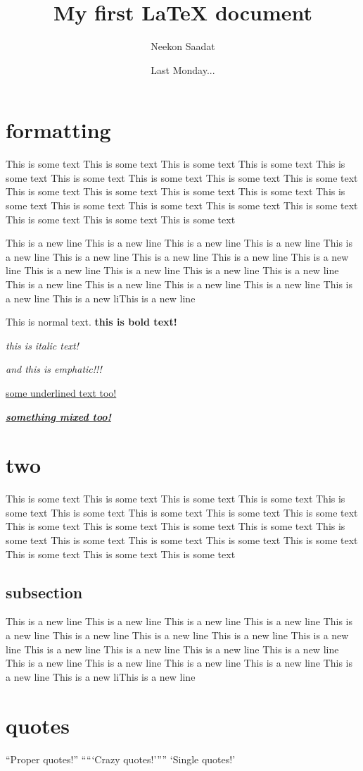\documentclass{article}
\author{Neekon Saadat}
\title{My first {\LaTeX} document}
\date{Last Monday...}
\begin{document}
\maketitle
\section{formatting}
This is some text This is some text This is some text This is some text This is some text This is some text This is some text This is some text This is some text This is some text This is some text This is some text This is some text This is some text This is some text This is some text This is some text This is some text This is some text This is some text This is some text 

This is a new line This is a new line This is a new line This is a new line This is a new line This is a new line This is a new line This is a new line This is a new line This is a new line This is a new line This is a new line This is a new line This is a new line This is a new line This is a new line This is a new line This is a new line This is a new liThis is a new line 

This is normal text. \textbf{this is bold text!}

\textit{this is italic text!}

\emph{and this is emphatic!!!}

\underline{some underlined text too!}

\textit{\textbf{\underline{something mixed too!}}}
\section{two}
This is some text This is some text This is some text This is some text This is some text This is some text This is some text This is some text This is some text This is some text This is some text This is some text This is some text This is some text This is some text This is some text This is some text This is some text This is some text This is some text This is some text 
\subsection{subsection}
This is a new line This is a new line This is a new line This is a new line This is a new line This is a new line This is a new line This is a new line This is a new line This is a new line This is a new line This is a new line This is a new line This is a new line This is a new line This is a new line This is a new line This is a new line This is a new liThis is a new line 
\section{quotes}
``Proper quotes!''
`````Crazy quotes!'''''
`Single quotes!'
\end{document}
